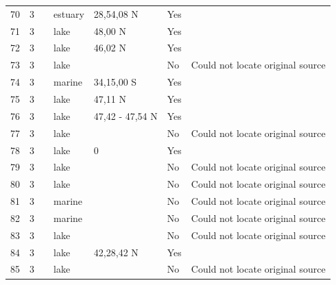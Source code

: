 \documentclass[12pt]{article}
\begin{document}
\begin{landscape}
\begin{table}[h!]
{\begin{tabular}{p{2.8cm}p{1.3cm}p{3cm}p{2.2cm}p{2.5cm}lp{8.2cm}}
        70    & 3 & \cite{Kemp1977}    & estuary & 28,54,08 N & Yes   &       \\
        71    & 3 & \cite{Sorokin1972}  & lake & 48,00 N & Yes   &       \\
        72    & 3 & \cite{Baril1983}  & lake & 46,02 N & Yes   &       \\
        73    & 3 & \cite{Schiemer1979}  & lake &       & No    & Could not locate original source \\
        74    & 3 & \cite{Brown1964} & marine & 34,15,00 S & Yes   &       \\
        75    & 3 & \cite{Pechlaner1972}  & lake & 47,11 N & Yes   &       \\
        76    & 3 & \cite{Schiemer1979}  & lake & 47,42 - 47,54 N & Yes   &       \\
        77    & 3 & \cite{Cohen1990}  & lake &       & No    & Could not locate original source \\
        78    & 3 & \cite{Burgis1972}  & lake & 0     & Yes   &       \\
        79    & 3 & \cite{Sarvala1974}  & lake &       & No    & Could not locate original source \\
        80    & 3 & \cite{Sarvala1974}  & lake &       & No    & Could not locate original source \\
        81    & 3 & \cite{Hatanaka1977}  & marine &       & No    & Could not locate original source \\
        82    & 3 & \cite{Cohen1990} & marine &       & No    & Could not locate original source \\
        83    & 3 & \cite{Cohen1990}  & lake &       & No    & Could not locate original source \\
        84    & 3 & \cite{Wilbur1972}    & lake & 42,28,42 N & Yes   &       \\
        85    & 3 & \cite{Mizuno1982}  & lake &       & No    & Could not locate original source \\
        \hline
      \end{tabular}}%
      \end{table}

        \newpage


\end{landscape}
\end{document}

